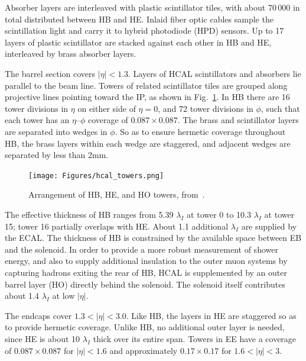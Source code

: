 Absorber layers are interleaved with plastic scintillator tiles, with about 70\,000 in total distributed between HB and HE.
Inlaid fiber optic cables sample the scintillation light and carry it to hybrid photodiode (HPD) sensors. Up to 17 layers of
plastic scintillator are stacked against each other in HB and HE, interleaved by brass absorber layers.

The barrel section covers $|\eta| < 1.3$.
Layers of HCAL scintillators and absorbers lie parallel to the beam line. Towers of related scintillator tiles are grouped along
projective lines pointing toward the IP, as shown in Fig.~\ref{fig:hcal_towers}.
In HB there are 16 tower divisions in $\eta$ on either side of $\eta = 0$, and 72 tower divisions in $\phi$, such that each tower
has an $\eta$--$\phi$ coverage of $0.087{\times}0.087$. The brass and scintillator layers are separated into wedges in $\phi$.
So as to ensure hermetic coverage throughout HB, the brass layers within each wedge are staggered, and adjacent wedges are separated by less than 2\unit{mm}.

\begin{figure}[hbtp]
  \begin{center}
    \texttt{[image: Figures/hcal\_towers.png]}
    \caption{
    Arrangement of HB, HE, and HO towers, from~\cite{ref:1748-0221/3/08/S08004}.
    }
    \label{fig:hcal_towers}
  \end{center}
\end{figure}

The effective thickness of HB ranges from 5.39 $\lambda_{I}$ at tower 0 to 10.3 $\lambda_{I}$ at tower 15; tower 16 partially overlaps with HE.
About 1.1 additional $\lambda_{I}$ are supplied by the ECAL. The thickness of HB is constrained by the available space between EB
and the solenoid. In order to provide a more robust measurement of shower energy, and also to supply additional insulation to the outer muon systems
by capturing hadrons exiting the rear of HB, HCAL is supplemented by an outer barrel layer (HO) directly behind the solenoid.
The solenoid itself contributes about 1.4 $\lambda_{I}$ at low $|\eta|$.

The endcaps cover $1.3 < |\eta| < 3.0$. Like HB, the layers in HE are staggered so as to provide hermetic coverage. Unlike HB,
no additional outer layer is needed, since HE is about 10 $\lambda_{I}$ thick over its entire span. Towers in EE have a coverage
of $0.087{\times}0.087$ for $|\eta| < 1.6$ and approximately $0.17{\times}0.17$ for $1.6 < |\eta| < 3$.

